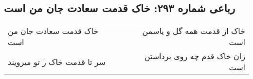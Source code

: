 \begin{center}
\section*{رباعی شماره ۲۹۳: خاک قدمت سعادت جان من است}
\label{sec:0293}
\begin{longtable}{l p{0.5cm} r}
خاک قدمت سعادت جان من است
&&
خاک از قدمت همه گل و یاسمن است
\\
سر تا قدمت خاک ز تو میرویند
&&
زان خاک قدم چه روی برداشتن است
\\
\end{longtable}
\end{center}
